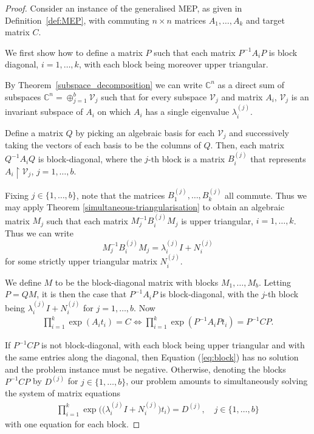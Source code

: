 \begin{proof}
  Consider an instance of the generalised MEP, as given in Definition~\ref{def:MEP},
  with commuting $n\times n$ matrices $A_1,\ldots,A_k$ and target
  matrix $C$.

  We first show how to define a matrix $P$ such that each matrix
  $P^{-1}A_iP$ is block diagonal, $i=1,\ldots,k$, with each block
  being moreover upper triangular.

  By Theorem~\ref{subspace_decomposition} we can write $\mathbb{C}^n$
  as a direct sum of subspaces $\mathbb{C}^n = \oplus_{j=1}^b \mathcal{V}_j$
  such that for every subspace $\mathcal{V}_j$ and matrix $A_i$, $\mathcal{V}_j$ is an
  invariant subspace of $A_i$ on which $A_i$ has a single eigenvalue
  $\lambda_i^{(j)}$.

  Define a matrix $Q$ by picking an algebraic basis for each
  $\mathcal{V}_j$ and successively taking the vectors of each basis to
  be the columns of $Q$. Then, each matrix $Q^{-1} A_{i} Q$ is
  block-diagonal, where the $j$-th block is a matrix $B^{(j)}_i$ that
  represents $A_{i} \restriction{\mathcal{V}_j}$, $j=1,\ldots,b$.

  Fixing $j\in\{1,\ldots,b\}$, note that the
  matrices $B_1^{(j)},\ldots,B_k^{(j)}$ all commute.  Thus we
  may apply Theorem \ref{simultaneous-triangularisation} to obtain an
  algebraic matrix $M_j$ such that each matrix $M_j^{-1} B^{(j)}_{i} M_j$
  is upper triangular, $i=1,\ldots,k$.  Thus we can write
  \[ M_j^{-1} B^{(j)}_{i} M_j = \lambda_i^{(j)}I + N_i^{(j)} \]
  for some strictly upper triangular matrix $ N_i^{(j)}$.

  We define $M$ to be the block-diagonal matrix with blocks $M_1,\ldots,M_b$.
  Letting $P=QM$, it is then the case
  that $P^{-1} A_{i} P$ is block-diagonal, with the $j$-th block being
  $\lambda_i^{(j)}I + N_i^{(j)}$ for $j=1,\ldots,b$.  Now
\begin{align}
\prod \limits_{i=1}^{k} \exp(A_{i} t_{i}) = C \Leftrightarrow \prod \limits_{i=1}^{k} \exp(P^{-1}A_{i}P t_{i}) = P^{-1}CP .
\label{eq:block}
\end{align}

If $P^{-1}CP$ is not block-diagonal, with each block being upper
triangular and with the same entries along the diagonal, then Equation
(\ref{eq:block}) has no solution and the problem instance must be
negative. Otherwise, denoting the blocks $P^{-1}CP$ by $D^{(j)}$ for
$j \in \lbrace 1, \ldots, b \rbrace$, our problem amounts to
simultaneously solving the system of matrix equations
\begin{align}
\prod\limits_{i=1}^{k} \exp\big(\big(\lambda_i^{(j)}I + N_i^{(j)}\big)t_{i}\big) = D^{(j)}, \quad j \in \lbrace 1, \ldots, b \rbrace
\label{eq:main1}
\end{align}
with one equation for each block.


\end{proof}
